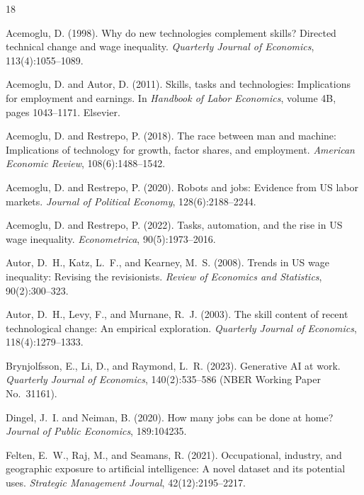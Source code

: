 \documentclass[12pt]{article}
\begin{document}
\newpage
\begin{thebibliography}{18}

Acemoglu, D. (1998).
\newblock Why do new technologies complement skills? Directed technical change and wage inequality.
\newblock \emph{Quarterly Journal of Economics}, 113(4):1055--1089.

Acemoglu, D. and Autor, D. (2011).
\newblock Skills, tasks and technologies: Implications for employment and earnings.
\newblock In \emph{Handbook of Labor Economics}, volume 4B, pages 1043--1171. Elsevier.

Acemoglu, D. and Restrepo, P. (2018).
\newblock The race between man and machine: Implications of technology for growth, factor shares, and employment.
\newblock \emph{American Economic Review}, 108(6):1488--1542.

Acemoglu, D. and Restrepo, P. (2020).
\newblock Robots and jobs: Evidence from US labor markets.
\newblock \emph{Journal of Political Economy}, 128(6):2188--2244.

Acemoglu, D. and Restrepo, P. (2022).
\newblock Tasks, automation, and the rise in US wage inequality.
\newblock \emph{Econometrica}, 90(5):1973--2016.

Autor, D.~H., Katz, L.~F., and Kearney, M.~S. (2008).
\newblock Trends in US wage inequality: Revising the revisionists.
\newblock \emph{Review of Economics and Statistics}, 90(2):300--323.

Autor, D.~H., Levy, F., and Murnane, R.~J. (2003).
\newblock The skill content of recent technological change: An empirical exploration.
\newblock \emph{Quarterly Journal of Economics}, 118(4):1279--1333.

Brynjolfsson, E., Li, D., and Raymond, L.~R. (2023).
\newblock Generative AI at work.
\newblock \emph{Quarterly Journal of Economics}, 140(2):535--586 (NBER Working Paper No.~31161).

Dingel, J.~I. and Neiman, B. (2020).
\newblock How many jobs can be done at home?
\newblock \emph{Journal of Public Economics}, 189:104235.

Felten, E.~W., Raj, M., and Seamans, R. (2021).
\newblock Occupational, industry, and geographic exposure to artificial intelligence: A novel dataset and its potential uses.
\newblock \emph{Strategic Management Journal}, 42(12):2195--2217.


\end{thebibliography}
\end{document}
